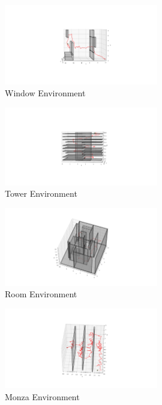 \documentclass[conference]{IEEEtran}
\begin{document}
\begin{figure}[H]
    \centering
    \includegraphics[width=0.6\textwidth]{window_rrt_b.png}
    \caption{Window Environment}
    \label{fig:window_rrt_biased}
\end{figure}
\begin{figure}[H]
    \centering
    \includegraphics[width=0.6\textwidth]{tower_rrt_b.png}
    \caption{Tower Environment}
    \label{fig:tower_rrt_biased}
\end{figure}
\begin{figure}[H]
    \centering
    \includegraphics[width=0.6\textwidth]{room_rrt_b.png}
    \caption{Room Environment}
    \label{fig:room_rrt_biased}
\end{figure}
\begin{figure}[H]
    \centering
    \includegraphics[width=0.6\textwidth]{monza_rrt_b.png}
    \caption{Monza Environment}
    \label{fig:monza_rrt_biased}
\end{figure}
\end{document}
